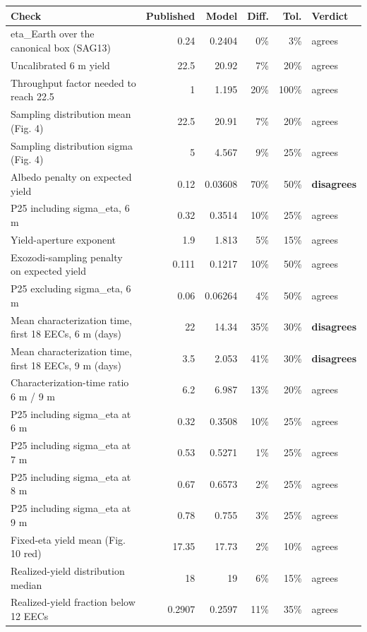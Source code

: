 \documentclass[11pt,a4paper]{article}
\begin{document}
\begin{table}[htbp]
\centering
\scriptsize
\begin{tabular}{p{5.4cm}rrrrl}
\toprule
\textbf{Check} & \textbf{Published} & \textbf{Model} & \textbf{Diff.} & \textbf{Tol.} & \textbf{Verdict} \\
\midrule
eta\_Earth over the canonical box (SAG13) & 0.24 & 0.2404 & 0\% & 3\% & agrees \\
Uncalibrated 6 m yield & 22.5 & 20.92 & 7\% & 20\% & agrees \\
Throughput factor needed to reach 22.5 & 1 & 1.195 & 20\% & 100\% & agrees \\
Sampling distribution mean (Fig. 4) & 22.5 & 20.91 & 7\% & 20\% & agrees \\
Sampling distribution sigma (Fig. 4) & 5 & 4.567 & 9\% & 25\% & agrees \\
Albedo penalty on expected yield & 0.12 & 0.03608 & 70\% & 50\% & \textbf{disagrees} \\
P25 including sigma\_eta, 6 m & 0.32 & 0.3514 & 10\% & 25\% & agrees \\
Yield-aperture exponent & 1.9 & 1.813 & 5\% & 15\% & agrees \\
Exozodi-sampling penalty on expected yield & 0.111 & 0.1217 & 10\% & 50\% & agrees \\
P25 excluding sigma\_eta, 6 m & 0.06 & 0.06264 & 4\% & 50\% & agrees \\
Mean characterization time, first 18 EECs, 6 m (days) & 22 & 14.34 & 35\% & 30\% & \textbf{disagrees} \\
Mean characterization time, first 18 EECs, 9 m (days) & 3.5 & 2.053 & 41\% & 30\% & \textbf{disagrees} \\
Characterization-time ratio 6 m / 9 m & 6.2 & 6.987 & 13\% & 20\% & agrees \\
P25 including sigma\_eta at 6 m & 0.32 & 0.3508 & 10\% & 25\% & agrees \\
P25 including sigma\_eta at 7 m & 0.53 & 0.5271 & 1\% & 25\% & agrees \\
P25 including sigma\_eta at 8 m & 0.67 & 0.6573 & 2\% & 25\% & agrees \\
P25 including sigma\_eta at 9 m & 0.78 & 0.755 & 3\% & 25\% & agrees \\
Fixed-eta yield mean (Fig. 10 red) & 17.35 & 17.73 & 2\% & 10\% & agrees \\
Realized-yield distribution median & 18 & 19 & 6\% & 15\% & agrees \\
Realized-yield fraction below 12 EECs & 0.2907 & 0.2597 & 11\% & 35\% & agrees \\

\end{tabular}
\end{table}
\end{document}
